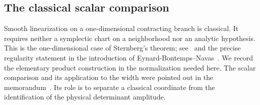 \subsection{The classical scalar comparison}
\label{sec:v15-scalar}
Smooth linearization on a one-dimensional contracting branch is
classical. It requires neither a symplectic chart on a neighborhood
nor an analytic hypothesis. This is the one-dimensional case of
Sternberg's theorem; see~\cite{Sternberg} and the precise regularity
statement in the introduction of Eynard-Bontemps--Navas~\cite{EN}.
We record the elementary product construction in the normalization
needed here. The scalar comparison and its application to the width
were pointed out in the memorandum~\cite{A2ReviewV14}. Its role is to
separate a classical coordinate from the identification of the physical
determinant amplitude.

